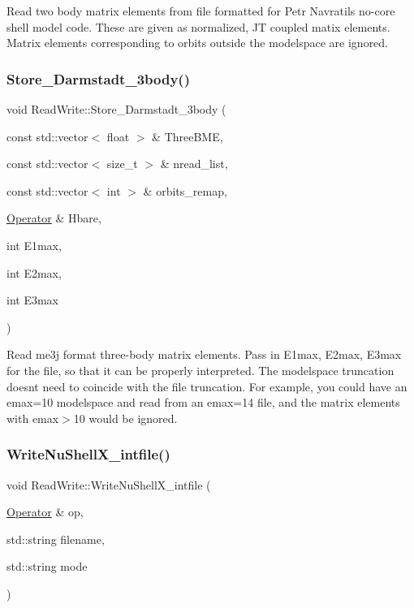 Read two body matrix elements from file formatted for Petr Navratil\textquotesingle{}s no-\/core shell model code. These are given as normalized, JT coupled matix elements. Matrix elements corresponding to orbits outside the modelspace are ignored. \mbox{\label{classReadWrite_a8c1bcfaf580336f44afe3c794029f678}} 
\subsubsection{\texorpdfstring{Store\+\_\+\+Darmstadt\+\_\+3body()}{Store\_Darmstadt\_3body()}}
{\footnotesize\ttfamily void Read\+Write\+::\+Store\+\_\+\+Darmstadt\+\_\+3body (\begin{DoxyParamCaption}\item[{const std\+::vector$<$ float $>$ \&}]{Three\+B\+ME,  }\item[{const std\+::vector$<$ size\+\_\+t $>$ \&}]{nread\+\_\+list,  }\item[{const std\+::vector$<$ int $>$ \&}]{orbits\+\_\+remap,  }\item[{\hyperlink{classOperator}{Operator} \&}]{Hbare,  }\item[{int}]{E1max,  }\item[{int}]{E2max,  }\item[{int}]{E3max }\end{DoxyParamCaption})}

Read me3j format three-\/body matrix elements. Pass in E1max, E2max, E3max for the file, so that it can be properly interpreted. The modelspace truncation doesn\textquotesingle{}t need to coincide with the file truncation. For example, you could have an emax=10 modelspace and read from an emax=14 file, and the matrix elements with emax$>$10 would be ignored. \mbox{\label{classReadWrite_a1ee0ccf08d328c35e30e228d3c2c343a}} 
\subsubsection{\texorpdfstring{Write\+Nu\+Shell\+X\+\_\+intfile()}{WriteNuShellX\_intfile()}}
{\footnotesize\ttfamily void Read\+Write\+::\+Write\+Nu\+Shell\+X\+\_\+intfile (\begin{DoxyParamCaption}\item[{\hyperlink{classOperator}{Operator} \&}]{op,  }\item[{std\+::string}]{filename,  }\item[{std\+::string}]{mode }\end{DoxyParamCaption})}

